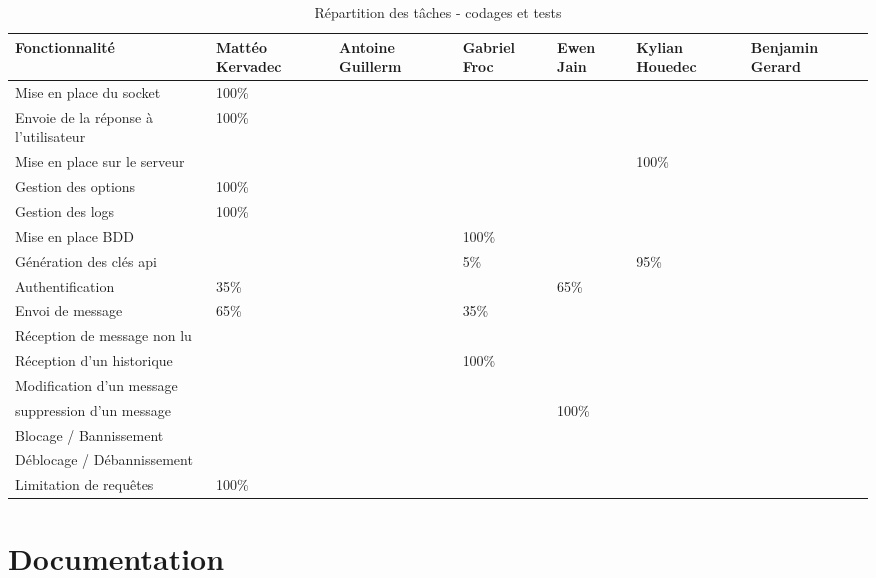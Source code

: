 \documentclass{report}
\begin{document}
\begin{table}[ht]
\hspace{-1cm}  %
\begin{tabular}{|p{3cm}|p{2cm}|p{2cm}|p{2cm}|p{2cm}|p{2cm}|p{2cm}|}
\hline
\textbf{Fonctionnalité} & \textbf{Mattéo Kervadec} & \textbf{Antoine Guillerm} & \textbf{Gabriel Froc} & \textbf{Ewen Jain} & \textbf{Kylian Houedec} & \textbf{Benjamin Gerard} \\
\hline
Mise en place du socket & 100\% & & & & & \\
\hline
Envoie de la réponse à l'utilisateur & 100\% & & & & & \\
\hline
Mise en place sur le serveur & & & & & 100\% & \\
\hline
Gestion des options & 100\% & & & & & \\
\hline
Gestion des logs & 100\% & & & & & \\
\hline
Mise en place BDD & & & 100\% & & & \\
\hline
Génération des clés api & & & 5\% & & 95\% & \\
\hline
Authentification & 35\% & & & 65\% & & \\
\hline
Envoi de message & 65\% & & 35\% & & & \\
\hline
Réception de message non lu & & & & & & \\
\hline
Réception d'un historique & & & 100\% & & & \\
\hline
Modification d'un message & & & & & & \\
\hline
suppression d'un message & & & & 100\% & & \\
\hline
Blocage / Bannissement & & & & & & \\
\hline
Déblocage / Débannissement &  & & & & & \\
\hline
Limitation de requêtes & 100\% & & & & & \\
\hline
\end{tabular}
\caption{Répartition des tâches - codages et tests}
\end{table}

\chapter{Documentation}
\end{document}
